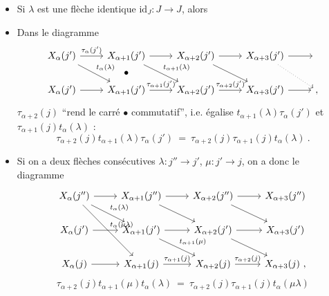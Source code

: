 \begin{itemize}[leftmargin=3em]
\item[(i)] Si $\lambda$ est une flèche identique $\mathrm{id}_J : J\longrightarrow J$, alors  %
\item[(ii)] Dans le diagramme
\[
\begin{tikzcd}
X_\alpha(j') \arrow[r,"\tau_\alpha(j')"] \arrow[dr,"t_\alpha(\lambda)"] & X_{\alpha+1}(j') \arrow[r] \arrow[dr,"t_{\alpha+1}(\lambda)"] \arrow[d,phantom,"\bullet"] & X_{\alpha+2}(j') \arrow[r] \arrow[dr] & X_{\alpha+3}(j') \arrow[r] \arrow[dr,dotted] & {} \\
X_\alpha(j') \arrow[r] & X_{\alpha+1}(j') \arrow[r,"\tau_{\alpha+1}(j')"] & X_{\alpha+2}(j') \arrow[r,"\tau_{\alpha+2}(j')"] & X_{\alpha+3}(j') \arrow[r] & {,}
\end{tikzcd}
\] %
$\tau_{\alpha+2}(j)$ “rend le carré $\bullet$ commutatif”, i.e. égalise $t_{\alpha+1}(\lambda)\tau_\alpha(j')$ et $\tau_{\alpha+1}(j)t_\alpha(\lambda)$ :
\[
\boxed{\tau_{\alpha+2}(j)t_{\alpha+1}(\lambda)\tau_\alpha(j')\ =\ \tau_{\alpha+2}(j)\tau_{\alpha+1}(j)t_\alpha(\lambda)\ .}
\]
\item[(iii)] Si on a deux flèches consécutives $\lambda : j''\longrightarrow j'$, $\mu : j'\longrightarrow j$, on a donc le diagramme
\[
\begin{tikzcd}
X_\alpha(j'') \arrow[r] \arrow[dr,"t_\alpha(\lambda)"] \arrow[ddr,"t_\alpha(\mu\lambda)"] & X_{\alpha+1}(j'') \arrow[r] \arrow[dr] & X_{\alpha+2}(j'') \arrow[r] \arrow[dr] & X_{\alpha+3}(j'') \\
X_\alpha(j') \arrow[r] & X_{\alpha+1}(j') \arrow[r] \arrow[dr,"t_{\alpha+1}(\mu)"] & X_{\alpha+2}(j') \arrow[r] \arrow[dr] & X_{\alpha+3}(j') \\
X_\alpha(j) \arrow[r] & X_{\alpha+1}(j) \arrow[r,"\tau_{\alpha+1}(j)"] & X_{\alpha+2}(j) \arrow[r,"\tau_{\alpha+2}(j)"] & X_{\alpha+3}(j)\ ,
\end{tikzcd}
\]
\[
\boxed{\tau_{\alpha+2}(j)t_{\alpha+1}(\mu)t_\alpha(\lambda)\ =\ \tau_{\alpha+2}(j)\tau_{\alpha+1}(j)t_\alpha(\mu\lambda)}
\]
\end{itemize}

